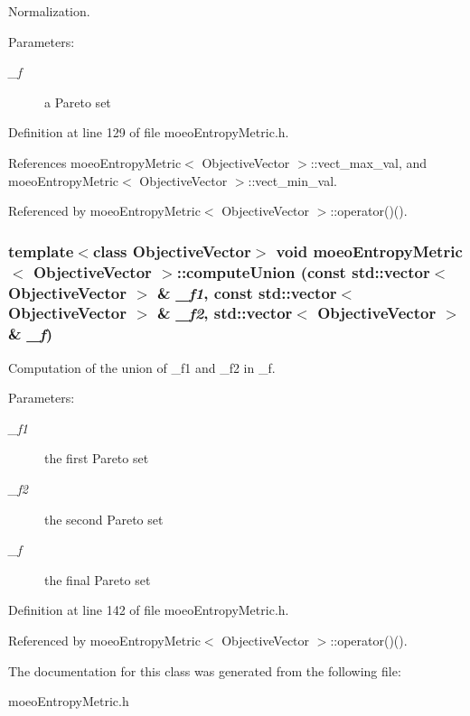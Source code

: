 Normalization. 

\begin{Desc}
\item[Parameters:]
\begin{description}
\item[{\em \_\-f}]a Pareto set \end{description}
\end{Desc}


Definition at line 129 of file moeo\-Entropy\-Metric.h.

References moeo\-Entropy\-Metric$<$ Objective\-Vector $>$::vect\_\-max\_\-val, and moeo\-Entropy\-Metric$<$ Objective\-Vector $>$::vect\_\-min\_\-val.

Referenced by moeo\-Entropy\-Metric$<$ Objective\-Vector $>$::operator()().
\subsubsection{\setlength{\rightskip}{0pt plus 5cm}template$<$class Objective\-Vector$>$ void \bf{moeo\-Entropy\-Metric}$<$ Objective\-Vector $>$::compute\-Union (const std::vector$<$ Objective\-Vector $>$ \& {\em \_\-f1}, const std::vector$<$ Objective\-Vector $>$ \& {\em \_\-f2}, std::vector$<$ Objective\-Vector $>$ \& {\em \_\-f})\hspace{0.3cm}{\tt  [inline, private]}}\label{classmoeoEntropyMetric_4b99c1842d780a89bda08e99a59e3e29}


Computation of the union of \_\-f1 and \_\-f2 in \_\-f. 

\begin{Desc}
\item[Parameters:]
\begin{description}
\item[{\em \_\-f1}]the first Pareto set \item[{\em \_\-f2}]the second Pareto set \item[{\em \_\-f}]the final Pareto set \end{description}
\end{Desc}


Definition at line 142 of file moeo\-Entropy\-Metric.h.

Referenced by moeo\-Entropy\-Metric$<$ Objective\-Vector $>$::operator()().

The documentation for this class was generated from the following file:\begin{CompactItemize}
\item 
moeo\-Entropy\-Metric.h\end{CompactItemize}

